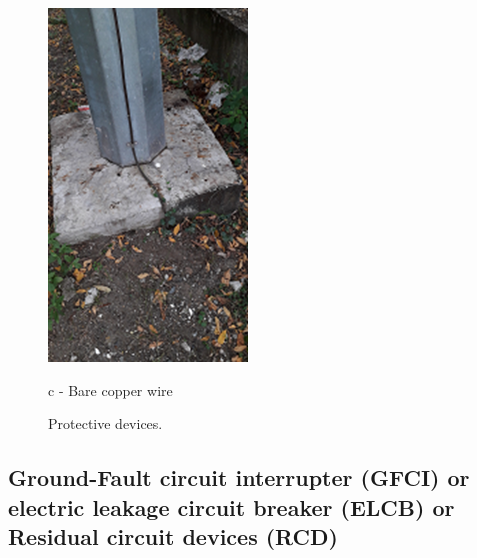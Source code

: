 \begin{figure}[!htb]
\begin{minipage}[b]{0.3\linewidth}
		\includegraphics[width=\textwidth]{figures/fig_ch04_elecaudit_visualinspection_barecopperwire}
		\caption*{c - Bare copper wire}
	\end{minipage}
	\caption{Protective devices.}
	\label{ch05_fig_fdassafety01}
\end{figure}


\subsection{Ground-Fault circuit interrupter (GFCI) or electric leakage circuit breaker (ELCB) or Residual circuit devices (RCD)} \label{ch04fdas03}
